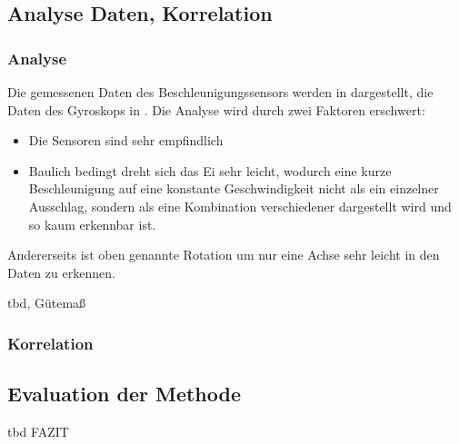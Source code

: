 \subsection{Analyse Daten, Korrelation}
\subsubsection{Analyse}
Die gemessenen Daten des Beschleunigungssensors werden in  dargestellt, die Daten des Gyroskops in .
Die Analyse wird durch zwei Faktoren erschwert:
\begin{itemize}
\item Die Sensoren sind sehr empfindlich
\item Baulich bedingt dreht sich das Ei sehr leicht, wodurch eine kurze Beschleunigung auf eine konstante Geschwindigkeit nicht als ein einzelner Ausschlag, sondern als eine Kombination verschiedener dargestellt wird und so kaum erkennbar ist.
\end{itemize}
Andererseits ist oben genannte Rotation um nur eine Achse sehr leicht in den Daten zu erkennen.

tbd,  Gütemaß

\subsubsection{Korrelation}


\subsection{Evaluation der Methode}
tbd FAZIT

